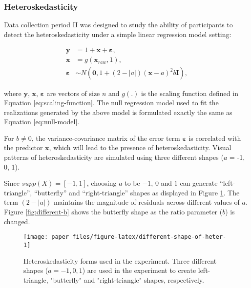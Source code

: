 \documentclass[]{interact}
\theoremstyle{plain}%
\theoremstyle{definition}
\theoremstyle{remark}
\begin{document}
\hypertarget{heteroskedasticity}{%
\subsubsection{Heteroskedasticity}\label{heteroskedasticity}}

Data collection period II was designed to study the ability of
participants to detect the heteroskedasticity under a simple linear
regression model setting:

\begin{align*} \label{eq:heter-model}
\boldsymbol{y} &= 1 + \boldsymbol{x} + \boldsymbol{\varepsilon},\\
\boldsymbol{x} &= g(\boldsymbol{x}_{raw}, 1),\\
\boldsymbol{\varepsilon} &\sim N(\boldsymbol{0}, 1 + (2 - |a|)(\boldsymbol{x} - a)^2b \boldsymbol{I}), 
\end{align*}

\noindent where \(\boldsymbol{y}\), \(\boldsymbol{x}\),
\(\boldsymbol{\varepsilon}\) are vectors of size \(n\) and \(g(.)\) is
the scaling function defined in Equation \ref{eq:scaling-function}. The
null regression model used to fit the realizations generated by the
above model is formulated exactly the same as Equation
\ref{eq:null-model}.

For \(b \neq 0\), the variance-covariance matrix of the error term
\(\boldsymbol{\varepsilon}\) is correlated with the predictor
\(\boldsymbol{x}\), which will lead to the presence of
heteroskedasticity. Visual patterns of heteroskedasticity are simulated
using three different shapes (\(a\) = -1, 0, 1).

Since \(supp(X) = [-1, 1]\), choosing \(a\) to be \(-1\), \(0\) and
\(1\) can generate ``left-triangle'', ``butterfly'' and
``right-triangle'' shapes as displayed in Figure
\ref{fig:different-shape-of-heter}. The term \((2 - |a|)\) maintains the
magnitude of residuals across different values of \(a\). Figure
\ref{fig:different-b} shows the butterfly shape as the ratio parameter
(\(b\)) is changed.

\begin{figure}[!h]

{\centering \texttt{[image: paper\_files/figure-latex/different-shape-of-heter-1]} 

}

\caption{Heteroskedasticity forms used in the experiment. Three different shapes ($a = -1, 0, 1$) are used in the experiment to create left-triangle, "butterfly" and "right-triangle" shapes, respectively.}\label{fig:different-shape-of-heter}
\end{figure}
\end{document}
